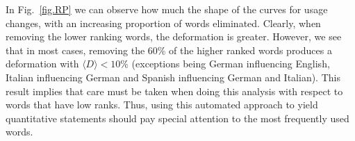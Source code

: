 \documentclass[10pt,letterpaper]{article} %
\begin{document}
% 

In Fig.~\ref{fig.RP} we can observe how much the shape of the curves for usage changes, 
with an increasing proportion of words eliminated. Clearly, when removing the 
lower ranking words, the deformation is greater. However, we see that in 
most cases,  removing the 60\% of the higher ranked words produces
a deformation with $\langle D \rangle < 10\%$ (exceptions being 
German influencing English, Italian influencing German and
Spanish influencing German and Italian). 
% 
% 
% 
% 
This result implies that care must be taken when doing this analysis with respect to 
words that have low ranks. Thus, using this automated approach
to yield quantitative statements should pay special attention to the most frequently used words. 

\end{document}
